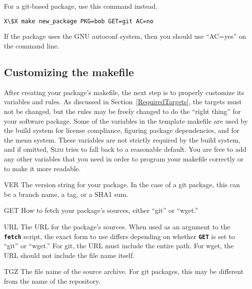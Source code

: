 \documentclass[a4paper,10pt]{article}
\newenvironment{Description}[1][\quad]{%
  \begin{list}{}{%
      \renewcommand{\makelabel}[1]{\textbf{##1}\hfill}%
      \settowidth{\labelwidth}{\textbf{#1}}%
      \setlength{\leftmargin}{\labelwidth+\labelsep}%
  }%
}{%
  \end{list}%
}
\newcommand{\slim}{\textsc{Slim}\xspace}
\newcommand{\fw}{\tt\bf}
\begin{document}
    For a git-based package, use this command instead.

\begin{lstlisting}[language=bash,escapechar=X]
X\$X make new_package PKG=bob GET=git AC=no
\end{lstlisting}

    If the package uses the GNU autoconf system, then you should use
    ``AC=yes'' on the command line.

\subsection{Customizing the makefile}

    After creating your package's makefile, the next step is to
    properly customize its variables and rules. As discussed in
    Section~\ref{RequiredTargets}, the targets must not be changed,
    but the rules may be freely changed to do the ``right thing'' for
    your software package. Some of the variables in the template
    makefile are used by the build system for license compliance,
    figuring package dependencies, and for the menu system. These
    variables are not strictly required by the build system, and if
    omitted, \slim tries to fall back to a reasonable default. You are
    free to add any other variables that you need in order to program
    your makefile correctly or to make it more readable.

    \begin{Description}[XXXXXX]
    \item[VER]
      The version string for your package. In the case of a git
      package, this can be a branch name, a tag, or a SHA1 sum.

    \item[GET]
      How to fetch your package's sources, either ``git'' or ``wget.''

    \item[URL]
      The URL for the package's sources. When used as an argument to
      the {\fw fetch} script, the exact form to use differs depending
      on whether {\fw GET} is set to ``git'' or ``wget.''  For git,
      the URL must include the entire path. For wget, the URL should
      not include the file name itself.

    \item[TGZ]
      The file name of the source archive. For git packages, this may
      be different from the name of the repository.

    \end{Description}
\end{document}
